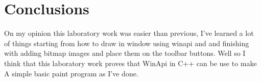 \section*{Conclusions}

On my opinion this laboratory work was easier than previous, I've learned a lot of things starting from how to draw in window using winapi and and finishing with adding bitmap images and place them on the toolbar buttons. Well so I think that this laboratory work proves that WinApi in C++ can be use to make A simple basic paint program as I've done.

\clearpage